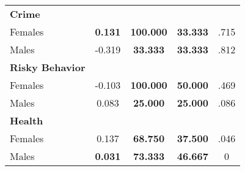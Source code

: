 \begin{tabular}{l c c c c}
\midrule
\textbf{Crime} & & & & \\
\quad Females &  \textbf{    0.131} & \textbf{  100.000} & \textbf{   33.333} & .715 \\
\quad Males &     -0.319 & \textbf{   33.333} & \textbf{   33.333} & .812 \\
\midrule
\textbf{Risky Behavior} & & & & \\
\quad Females &     -0.103 & \textbf{  100.000} & \textbf{   50.000} & .469 \\
\quad Males &      0.083 & \textbf{   25.000} & \textbf{   25.000} & .086 \\
\midrule
\textbf{Health} & & & & \\
\quad Females &      0.137 & \textbf{   68.750} & \textbf{   37.500} & .046 \\
\quad Males &  \textbf{    0.031} & \textbf{   73.333} & \textbf{   46.667} & 0 \\
\bottomrule
\end{tabular}
